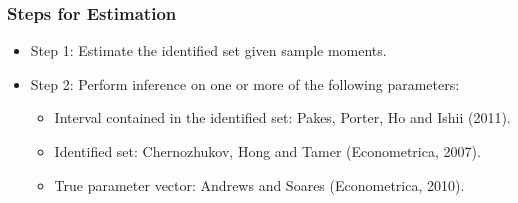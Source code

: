 \documentclass[notes=show]{beamer}
\begin{document}

\begin{frame}
\frametitle{Steps for Estimation}

\begin{itemize}
\item Step 1: Estimate the identified set given sample moments. 

\item Step 2: Perform inference on one or more of the following parameters: 

\begin{itemize}
\item Interval contained in the identified set: Pakes, Porter, Ho and Ishii
(2011). 

\item Identified set: Chernozhukov, Hong and Tamer (Econometrica, 2007). 

\item True parameter vector: Andrews and Soares (Econometrica, 2010). 
\end{itemize}
\end{itemize}
\end{frame}

\end{document}
